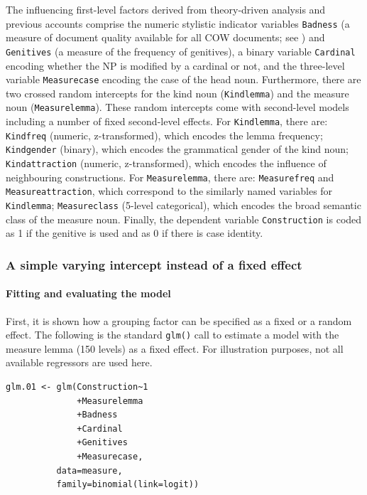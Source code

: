 The influencing first-level factors derived from theory-driven analysis and previous accounts comprise the numeric stylistic indicator variables \texttt{Badness} (a measure of document quality available for all COW documents; see \citealt{SchaeferEa2013}) and \texttt{Genitives} (a measure of the frequency of genitives), a binary variable \texttt{Cardinal} encoding whether the NP is modified by a cardinal or not, and the three-level variable \texttt{Measurecase} encoding the case of the head noun.
Furthermore, there are two crossed random intercepts for the kind noun (\texttt{Kindlemma}) and the measure noun (\texttt{Measurelemma}).
These random intercepts come with second-level models including a number of fixed second-level effects.
For \texttt{Kindlemma}, there are: \texttt{Kindfreq} (numeric, z-transformed), which encodes the lemma frequency; \texttt{Kindgender} (binary), which encodes the grammatical gender of the kind noun; \texttt{Kindattraction} (numeric, z-transformed), which encodes the influence of neighbouring constructions.
For \texttt{Measurelemma}, there are: \texttt{Measurefreq} and \texttt{Measureattraction}, which correspond to the similarly named variables for \texttt{Kindlemma}; \texttt{Measureclass} (5-level categorical), which encodes the broad semantic class of the measure noun.
Finally, the dependent variable \texttt{Construction} is coded as 1 if the genitive is used and as 0 if there is case identity.

\subsubsection{A simple varying intercept instead of a fixed effect}

\paragraph{Fitting and evaluating the model}

First, it is shown how a grouping factor can be specified as a fixed or a random effect.
The following is the standard \texttt{glm()} call to estimate a model with the measure lemma (150 levels) as a fixed effect.
For illustration purposes, not all available regressors are used here.

\vspace{0.5\baselineskip}

\begin{lstlisting}
glm.01 <- glm(Construction~1
              +Measurelemma
              +Badness
              +Cardinal
              +Genitives
              +Measurecase,
	      data=measure,
	      family=binomial(link=logit))
\end{lstlisting}

